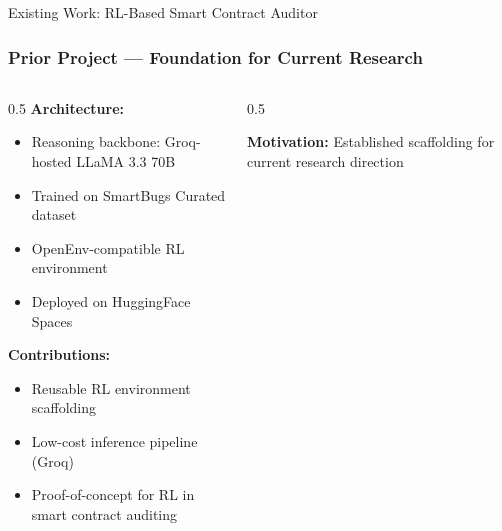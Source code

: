 \documentclass[aspectratio=169]{beamer}
\begin{document}
\begin{frame}{Existing Work: RL-Based Smart Contract Auditor}
\frametitle{Prior Project — Foundation for Current Research}

\begin{columns}[T]
\begin{column}{0.5\textwidth}
\textbf{Architecture:}
\begin{itemize}
    \item Reasoning backbone: Groq-hosted LLaMA 3.3 70B
    \item Trained on SmartBugs Curated dataset
    \item OpenEnv-compatible RL environment
    \item Deployed on HuggingFace Spaces
\end{itemize}

\vspace{0.5cm}

\textbf{Contributions:}
\begin{itemize}
    \item Reusable RL environment scaffolding
    \item Low-cost inference pipeline (Groq)
    \item Proof-of-concept for RL in smart contract auditing
\end{itemize}
\end{column}

\begin{column}{0.5\textwidth}
\begin{center}
\end{center}

\vspace{0.3cm}
\textbf{Motivation:} Established scaffolding for current research direction
\end{column}
\end{columns}

\end{frame}
\end{document}
